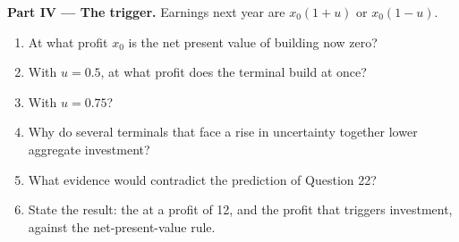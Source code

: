 \begin{problem}
\medskip
\noindent\textbf{Part IV --- The trigger.} Earnings next year are $x_0(1 + u)$ or $x_0(1 - u)$.
\begin{enumerate}[resume]
  \item At what profit $x_0$ is the net present value of building now zero?
  \item With $u = 0.5$, at what profit does the terminal build at once?
  \item With $u = 0.75$?
  \item Why do several terminals that face a rise in uncertainty together lower aggregate investment?
  \item What evidence would contradict the prediction of Question 22?
  \item State the result: the  at a profit of 12, and the profit that triggers investment, against
    the net-present-value rule.
\end{enumerate}
\end{problem}
